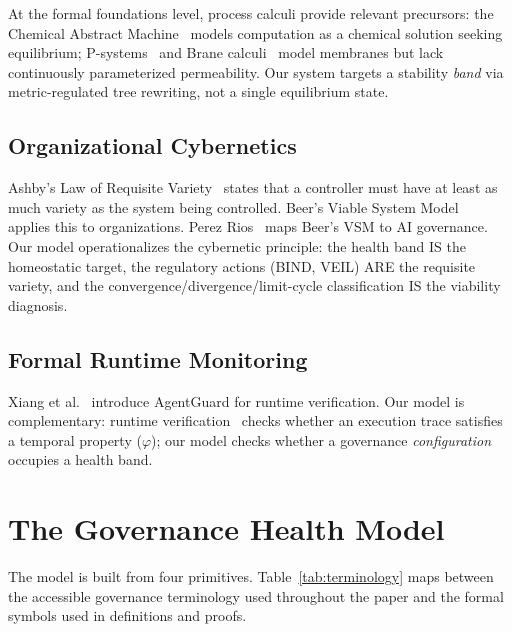 \documentclass[sigconf,nonacm]{acmart}
\begin{document}
At the formal foundations level, process calculi provide relevant
precursors: the Chemical Abstract
Machine~\cite{berry1992} models computation as a chemical solution
seeking equilibrium; P-systems~\cite{paun1998} and Brane
calculi~\cite{cardelli2005} model membranes but lack continuously
parameterized permeability. Our system targets a stability \emph{band}
via metric-regulated tree rewriting, not a single equilibrium state.

\subsection{Organizational Cybernetics}

Ashby's Law of Requisite Variety~\cite{ashby} states that a controller
must have at least as much variety as the system being controlled.
Beer's Viable System Model~\cite{beer} applies this to organizations.
Perez Rios~\cite{perezrios} maps Beer's VSM to AI governance. Our model
operationalizes the cybernetic principle: the health band IS the
homeostatic target, the regulatory actions (BIND, VEIL) ARE the
requisite variety, and the convergence/divergence/limit-cycle
classification IS the viability diagnosis.

\subsection{Formal Runtime Monitoring}

Xiang et al.~\cite{agentguard} introduce AgentGuard for runtime
verification. Our model is complementary: runtime
verification~\cite{leucker} checks whether an execution trace satisfies
a temporal property ($\varphi$); our model checks whether a governance
\emph{configuration} occupies a health band.


\section{The Governance Health Model}\label{sec:model}

The model is built from four primitives. Table~\ref{tab:terminology}
maps between the accessible governance terminology used throughout the
paper and the formal symbols used in definitions and proofs.
\end{document}
